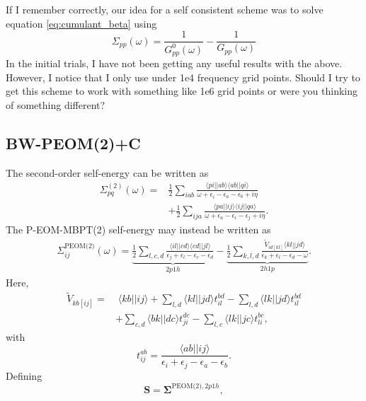 If I remember correctly, our idea for a self consistent scheme was to solve equation \ref{eq:cumulant_beta} using
\begin{equation}
    \Sigma_{pp}(\omega) = \frac{1}{G^0_{pp}(\omega)} - \frac{1}{G_{pp}(\omega)}
\end{equation}
In the initial trials, I have not been getting any useful results with the above. However, I notice that I only use under 1e4 frequency grid points. Should I try to get this scheme to work with something like 1e6 grid points or were you thinking of something different?
\subsection{BW-PEOM(2)+C}
The second-order self-energy can be written as
\begin{align}
\Sigma_{pq}^{(2)}(\omega)
=&
\frac{1}{2}
\sum_{iab}
\frac{
\langle pi || ab \rangle
\langle ab || qi \rangle
}{
\omega + \epsilon_i - \epsilon_a - \epsilon_b + i\eta
}
\nonumber\\
&+
\frac{1}{2}
\sum_{ija}
\frac{
\langle pa || ij \rangle
\langle ij || qa \rangle
}{
\omega + \epsilon_a - \epsilon_i - \epsilon_j + i\eta
}.
\end{align}
The P-EOM-MBPT(2) self-energy may instead be written as
\begin{align}
\Sigma_{ij}^{\text{PEOM(2)}}(\omega)
=
\underbrace{
\frac{1}{2}
\sum_{l,c,d}
\frac{
\langle il || cd \rangle
\langle cd || jl \rangle
}{
\epsilon_j+\epsilon_l-\epsilon_c-\epsilon_d
}
}_{2p1h}
-
\underbrace{
\frac{1}{2}
\sum_{k,l,d}
\frac{
\tilde{V}_{id[kl]}
\langle kl || jd \rangle
}{
\epsilon_k+\epsilon_l-\epsilon_d-\omega
}
}_{2h1p}.
\end{align}
Here,
\begin{align}
\tilde{V}_{kb[ij]}
=&\;
\langle kb || ij \rangle
+
\sum_{l,d}
\langle kl || jd \rangle
t_{il}^{bd}
-
\sum_{l,d}
\langle lk || jd \rangle
t_{il}^{bd}
\nonumber\\
&+
\sum_{c,d}
\langle bk || dc \rangle
t_{ji}^{dc}
-
\sum_{l,c}
\langle lk || jc \rangle
t_{li}^{bc},
\end{align}
with
\begin{equation}
t_{ij}^{ab}
=
\frac{
\langle ab || ij \rangle
}{
\epsilon_i+\epsilon_j-\epsilon_a-\epsilon_b
}.
\end{equation}
Defining
\begin{equation}
\mathbf{S}
=
\bm{\Sigma}^{\text{PEOM(2)},2p1h},
\end{equation}
